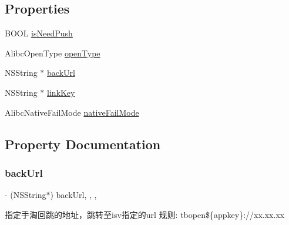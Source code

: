 \subsection*{Properties}
\begin{DoxyCompactItemize}
\item 
B\+O\+OL \mbox{\hyperlink{interface_alibc_trade_show_params_ad0066946016fceaa7ee01a308f73860f}{is\+Need\+Push}}
\item 
Alibc\+Open\+Type \mbox{\hyperlink{interface_alibc_trade_show_params_a7ac6bca730a8368eadf1d6ca5a129ed6}{open\+Type}}
\item 
N\+S\+String $\ast$ \mbox{\hyperlink{interface_alibc_trade_show_params_aaf15de1ba2f023bb55aade091e21af15}{back\+Url}}
\item 
N\+S\+String $\ast$ \mbox{\hyperlink{interface_alibc_trade_show_params_a2f172992993ff2be1b269b25b2af8153}{link\+Key}}
\item 
Alibc\+Native\+Fail\+Mode \mbox{\hyperlink{interface_alibc_trade_show_params_a29420ac73c7fd3a90af8ab566460745b}{native\+Fail\+Mode}}
\end{DoxyCompactItemize}


\subsection{Property Documentation}
\mbox{\label{interface_alibc_trade_show_params_aaf15de1ba2f023bb55aade091e21af15}} 
\subsubsection{\texorpdfstring{back\+Url}{backUrl}}
{\footnotesize\ttfamily -\/ (N\+S\+String$\ast$) back\+Url\hspace{0.3cm}{\ttfamily [read]}, {\ttfamily [write]}, {\ttfamily [nonatomic]}, {\ttfamily [strong]}}

指定手淘回跳的地址，跳转至isv指定的url 规则\+: tbopen\$\{appkey\}\+://xx.xx.\+xx \mbox{\label{interface_alibc_trade_show_params_ad0066946016fceaa7ee01a308f73860f}} 
